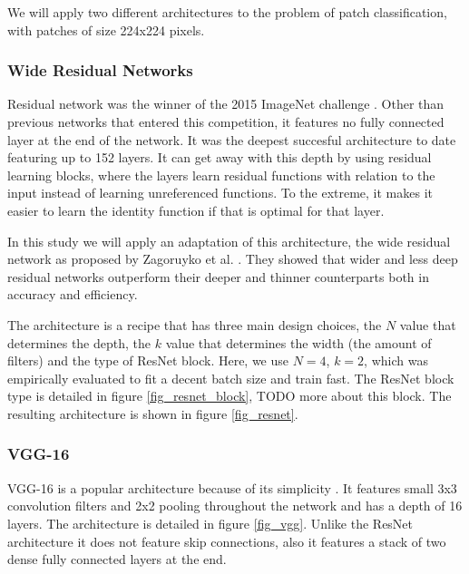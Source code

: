 \documentclass[journal]{IEEEtran}
\begin{document}
We will apply two different architectures to the problem of patch classification, with patches of size 224x224 pixels.


\subsubsection{Wide Residual Networks}
Residual network was the winner of the 2015 ImageNet challenge \cite{resnet}. Other than previous networks that entered this competition, it features no fully connected layer at the end of the network. It was the deepest succesful architecture to date featuring up to 152 layers. It can get away with this depth by using residual learning blocks, where the layers learn residual functions with relation to the input instead of learning unreferenced functions. To the extreme, it makes it easier to learn the identity function if that is optimal for that layer.

In this study we will apply an adaptation of this architecture, the wide residual network as proposed by Zagoruyko et al. \cite{wideresnet}. They showed that wider and less deep residual networks outperform their deeper and thinner counterparts both in accuracy and efficiency. 

The architecture is a recipe that has three main design choices, the $N$ value that determines the depth, the $k$ value that determines the width (the amount of filters) and the type of ResNet block. Here, we use $N=4$, $k=2$, which was empirically evaluated to fit a decent batch size and train fast. The ResNet block type is detailed in figure \ref{fig_resnet_block}, TODO more about this block. The resulting architecture is shown in figure \ref{fig_resnet}.

\subsubsection{VGG-16}
VGG-16 is a popular architecture because of its simplicity \cite{vgg}. It features small 3x3 convolution filters and 2x2 pooling throughout the network and has a depth of 16 layers. The architecture is detailed in figure \ref{fig_vgg}. Unlike the ResNet architecture it does not feature skip connections, also it features a stack of two dense fully connected layers at the end.
\end{document}
